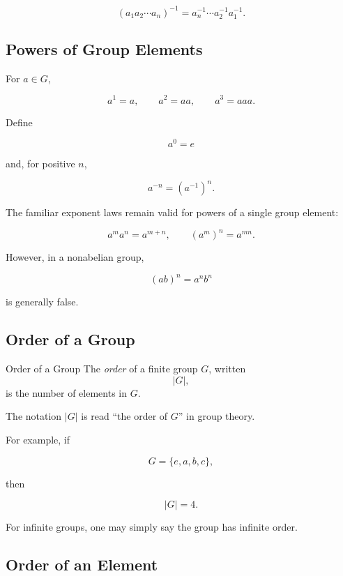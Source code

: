 \[ (a_1a_2\cdots a_n)^{-1}=a_n^{-1}\cdots a_2^{-1}a_1^{-1}. \]

\subsection{Powers of Group Elements}
\label{subsec:group-powers}

For \(a\in G\),

\[ a^1=a,\qquad a^2=aa,\qquad a^3=aaa. \]

Define

\[ a^0=e \]

and, for positive \(n\),

\[ a^{-n}=(a^{-1})^n. \]

The familiar exponent laws remain valid for powers of a single group element:

\[ a^ma^n=a^{m+n},\qquad (a^m)^n=a^{mn}. \]

However, in a nonabelian group,

\[ (ab)^n=a^nb^n \]

is generally false.

\subsection{Order of a Group}
\label{subsec:order-group}

\begin{definitionbox}{Order of a Group}
The \emph{order} of a finite group \(G\), written
\[ |G|, \]
is the number of elements in \(G\).
\end{definitionbox}

The notation \(|G|\) is read ``the order of \(G\)'' in group theory.

For example, if

\[ G=\{e,a,b,c\}, \]

then

\[ |G|=4. \]

For infinite groups, one may simply say the group has infinite order.

\subsection{Order of an Element}
\label{subsec:order-element}

